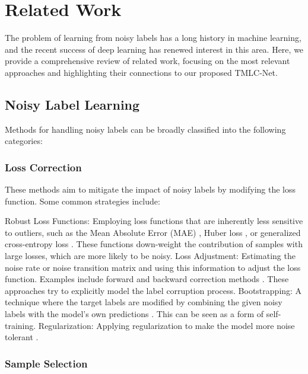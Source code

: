 \section{Related Work}
\label{sec:related_work}

The problem of learning from noisy labels has a long history in machine learning, and the recent success of deep learning has renewed interest in this area.  Here, we provide a comprehensive review of related work, focusing on the most relevant approaches and highlighting their connections to our proposed TMLC-Net.

\subsection{Noisy Label Learning}
\label{sec:related_noisy}

Methods for handling noisy labels can be broadly classified into the following categories:

\subsubsection{Loss Correction}
\label{sec:related_noisy_loss}

These methods aim to mitigate the impact of noisy labels by modifying the loss function.  Some common strategies include:

Robust Loss Functions: Employing loss functions that are inherently less sensitive to outliers, such as the Mean Absolute Error (MAE) \cite{ghosh2017robust}, Huber loss \cite{huber1964robust}, or generalized cross-entropy loss \cite{zhang2018generalized}. These functions down-weight the contribution of samples with large losses, which are more likely to be noisy.
Loss Adjustment:  Estimating the noise rate or noise transition matrix and using this information to adjust the loss function. Examples include forward and backward correction methods \cite{patrini2017making, hendrycks2018deep, northcutt2017learning, liu2020early}. These approaches try to explicitly model the label corruption process.
Bootstrapping:  A technique where the target labels are modified by combining the given noisy labels with the model's own predictions \cite{reed2014training, arazo2019unsupervised}. This can be seen as a form of self-training.
Regularization: Applying regularization to make the model more noise tolerant \cite{laine2016temporal, miyato2018virtual}.

\subsubsection{Sample Selection}
\label{sec:related_noisy_sample}

